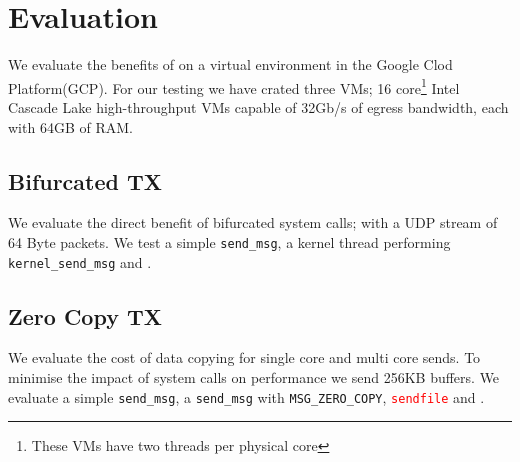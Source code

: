 \section{Evaluation}
We evaluate the benefits of \oursys on a virtual environment in the Google Clod Platform(GCP).
For our testing we have crated three VMs; 16 core\footnote{These VMs have two threads per physical core} Intel Cascade Lake high-throughput VMs capable of 32Gb/s of  egress bandwidth\cite{gcp}, each with 64GB of RAM.

\subsection{Bifurcated TX}\label{sec:eval_bif}
We evaluate the direct benefit of bifurcated system calls; with a UDP stream of 64 Byte packets.
We test a simple \texttt{send\_msg}, a kernel thread performing \texttt{kernel\_send\_msg} and \oursys.

\subsection{Zero Copy TX}
We evaluate the cost of data copying for single core and multi core sends. To minimise the impact of system calls on performance we send 256KB buffers. We evaluate a simple \texttt{send\_msg}, a \texttt{send\_msg} with \texttt{MSG\_ZERO\_COPY}, \textcolor{red}{\texttt{sendfile}} and \oursys.

